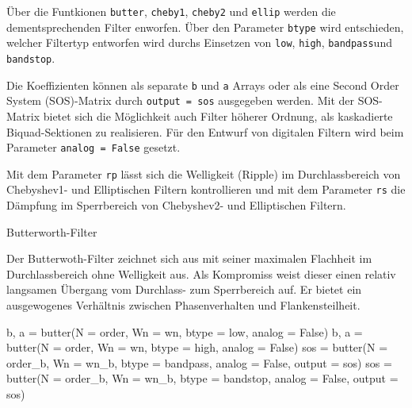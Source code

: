 \documentclass[
  ngerman,
  letterpaper,
  DIV=11]{scrreprt}
\newenvironment{Shaded}{\begin{snugshade}}{\end{snugshade}}
\newcommand{\NormalTok}[1]{\textcolor[rgb]{0.00,0.23,0.31}{#1}}
\newcommand{\OperatorTok}[1]{\textcolor[rgb]{0.37,0.37,0.37}{#1}}
\newcommand{\StringTok}[1]{\textcolor[rgb]{0.13,0.47,0.30}{#1}}
\newcommand{\VariableTok}[1]{\textcolor[rgb]{0.07,0.07,0.07}{#1}}
\begin{document}
Über die Funtkionen \texttt{butter}, \texttt{cheby1}, \texttt{cheby2}
und \texttt{ellip} werden die dementsprechenden Filter enworfen. Über
den Parameter \texttt{btype} wird entschieden, welcher Filtertyp
entworfen wird durchs Einsetzen von \texttt{low}, \texttt{high},
\texttt{bandpass}und \texttt{bandstop}.

Die Koeffizienten können als separate \texttt{b} und \texttt{a} Arrays
oder als eine Second Order System (SOS)-Matrix durch
\texttt{output\ =\ \textquotesingle{}sos\textquotesingle{}} ausgegeben
werden. Mit der SOS-Matrix bietet sich die Möglichkeit auch Filter
höherer Ordnung, als kaskadierte Biquad-Sektionen zu realisieren. Für
den Entwurf von digitalen Filtern wird beim Parameter
\texttt{analog\ =\ False} gesetzt.

Mit dem Parameter \texttt{rp} lässt sich die Welligkeit (Ripple) im
Durchlassbereich von Chebyshev1- und Elliptischen Filtern kontrollieren
und mit dem Parameter \texttt{rs} die Dämpfung im Sperrbereich von
Chebyshev2- und Elliptischen Filtern.

Butterworth-Filter

Der Butterwoth-Filter zeichnet sich aus mit seiner maximalen Flachheit
im Durchlassbereich ohne Welligkeit aus. Als Kompromiss weist dieser
einen relativ langsamen Übergang vom Durchlass- zum Sperrbereich auf. Er
bietet ein ausgewogenes Verhältnis zwischen Phasenverhalten und
Flankensteilheit.

\begin{Shaded}
\begin{Highlighting}[]
\NormalTok{b, a }\OperatorTok{=}\NormalTok{ butter(N }\OperatorTok{=}\NormalTok{ order, Wn }\OperatorTok{=}\NormalTok{ wn, btype }\OperatorTok{=} \StringTok{\textquotesingle{}low\textquotesingle{}}\NormalTok{, analog }\OperatorTok{=} \VariableTok{False}\NormalTok{)}
\NormalTok{b, a }\OperatorTok{=}\NormalTok{ butter(N }\OperatorTok{=}\NormalTok{ order, Wn }\OperatorTok{=}\NormalTok{ wn, btype }\OperatorTok{=} \StringTok{\textquotesingle{}high\textquotesingle{}}\NormalTok{, analog }\OperatorTok{=} \VariableTok{False}\NormalTok{)}
\NormalTok{sos }\OperatorTok{=}\NormalTok{ butter(N }\OperatorTok{=}\NormalTok{ order\_b, Wn }\OperatorTok{=}\NormalTok{ wn\_b, btype }\OperatorTok{=} \StringTok{\textquotesingle{}bandpass\textquotesingle{}}\NormalTok{,}
\NormalTok{             analog }\OperatorTok{=} \VariableTok{False}\NormalTok{, output }\OperatorTok{=} \StringTok{\textquotesingle{}sos\textquotesingle{}}\NormalTok{)}
\NormalTok{sos }\OperatorTok{=}\NormalTok{ butter(N }\OperatorTok{=}\NormalTok{ order\_b, Wn }\OperatorTok{=}\NormalTok{ wn\_b, btype }\OperatorTok{=} \StringTok{\textquotesingle{}bandstop\textquotesingle{}}\NormalTok{,}
\NormalTok{             analog }\OperatorTok{=} \VariableTok{False}\NormalTok{, output }\OperatorTok{=} \StringTok{\textquotesingle{}sos\textquotesingle{}}\NormalTok{)}
\end{Highlighting}
\end{Shaded}
\end{document}
